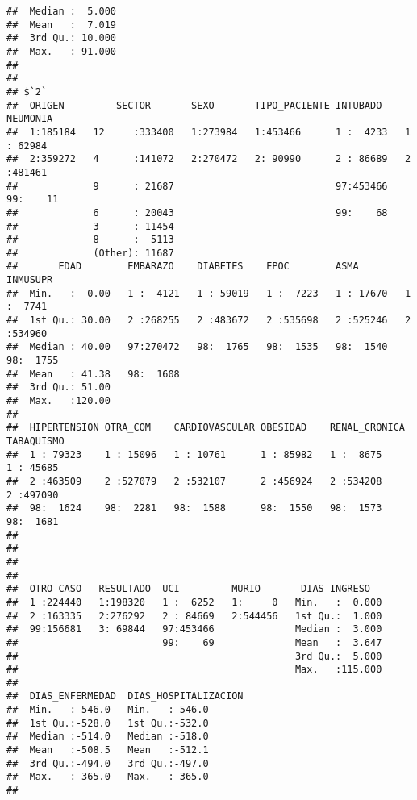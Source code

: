 \documentclass[]{article}
\begin{document}
\begin{verbatim}
##  Median :  5.000     
##  Mean   :  7.019     
##  3rd Qu.: 10.000     
##  Max.   : 91.000     
##                      
## 
## $`2`
##  ORIGEN         SECTOR       SEXO       TIPO_PACIENTE INTUBADO    NEUMONIA   
##  1:185184   12     :333400   1:273984   1:453466      1 :  4233   1 : 62984  
##  2:359272   4      :141072   2:270472   2: 90990      2 : 86689   2 :481461  
##             9      : 21687                            97:453466   99:    11  
##             6      : 20043                            99:    68              
##             3      : 11454                                                   
##             8      :  5113                                                   
##             (Other): 11687                                                   
##       EDAD        EMBARAZO    DIABETES    EPOC        ASMA        INMUSUPR   
##  Min.   :  0.00   1 :  4121   1 : 59019   1 :  7223   1 : 17670   1 :  7741  
##  1st Qu.: 30.00   2 :268255   2 :483672   2 :535698   2 :525246   2 :534960  
##  Median : 40.00   97:270472   98:  1765   98:  1535   98:  1540   98:  1755  
##  Mean   : 41.38   98:  1608                                                  
##  3rd Qu.: 51.00                                                              
##  Max.   :120.00                                                              
##                                                                              
##  HIPERTENSION OTRA_COM    CARDIOVASCULAR OBESIDAD    RENAL_CRONICA TABAQUISMO 
##  1 : 79323    1 : 15096   1 : 10761      1 : 85982   1 :  8675     1 : 45685  
##  2 :463509    2 :527079   2 :532107      2 :456924   2 :534208     2 :497090  
##  98:  1624    98:  2281   98:  1588      98:  1550   98:  1573     98:  1681  
##                                                                               
##                                                                               
##                                                                               
##                                                                               
##  OTRO_CASO   RESULTADO  UCI         MURIO       DIAS_INGRESO    
##  1 :224440   1:198320   1 :  6252   1:     0   Min.   :  0.000  
##  2 :163335   2:276292   2 : 84669   2:544456   1st Qu.:  1.000  
##  99:156681   3: 69844   97:453466              Median :  3.000  
##                         99:    69              Mean   :  3.647  
##                                                3rd Qu.:  5.000  
##                                                Max.   :115.000  
##                                                                 
##  DIAS_ENFERMEDAD  DIAS_HOSPITALIZACION
##  Min.   :-546.0   Min.   :-546.0      
##  1st Qu.:-528.0   1st Qu.:-532.0      
##  Median :-514.0   Median :-518.0      
##  Mean   :-508.5   Mean   :-512.1      
##  3rd Qu.:-494.0   3rd Qu.:-497.0      
##  Max.   :-365.0   Max.   :-365.0      
## 
\end{verbatim}
\end{document}
